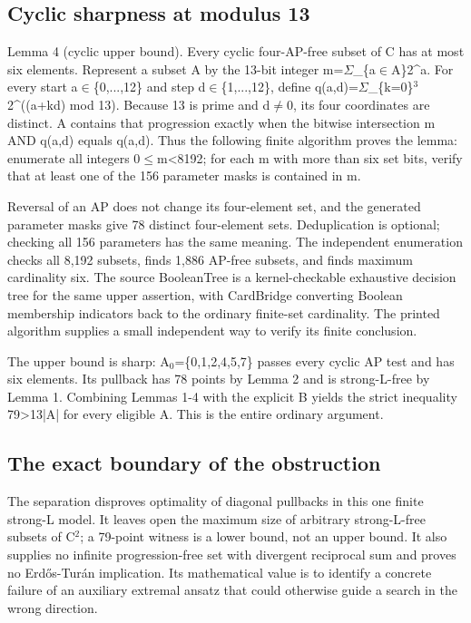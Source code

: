 \documentclass[11pt,a4paper]{article}
\begin{document}
\subsection{Cyclic sharpness at modulus 13}
Lemma 4 (cyclic upper bound). Every cyclic four-AP-free subset of C has at most six elements. Represent a subset A by the 13-bit integer m=\ensuremath{\Sigma}\_\{a\ensuremath{\in}A\}2\textasciicircum{}a. For every start a\ensuremath{\in}\{0,...,12\} and step d\ensuremath{\in}\{1,...,12\}, define q(a,d)=\ensuremath{\Sigma}\_\{k=0\}\ensuremath{^3}2\textasciicircum{}((a+kd) mod 13). Because 13 is prime and d\ensuremath{\neq}0, its four coordinates are distinct. A contains that progression exactly when the bitwise intersection m AND q(a,d) equals q(a,d). Thus the following finite algorithm proves the lemma: enumerate all integers 0\ensuremath{\leq}m<8192; for each m with more than six set bits, verify that at least one of the 156 parameter masks is contained in m.

Reversal of an AP does not change its four-element set, and the generated parameter masks give 78 distinct four-element sets. Deduplication is optional; checking all 156 parameters has the same meaning. The independent enumeration checks all 8,192 subsets, finds 1,886 AP-free subsets, and finds maximum cardinality six. The source BooleanTree is a kernel-checkable exhaustive decision tree for the same upper assertion, with CardBridge converting Boolean membership indicators back to the ordinary finite-set cardinality. The printed algorithm supplies a small independent way to verify its finite conclusion.

The upper bound is sharp: A\ensuremath{_0}=\{0,1,2,4,5,7\} passes every cyclic AP test and has six elements. Its pullback has 78 points by Lemma 2 and is strong-L-free by Lemma 1. Combining Lemmas 1-4 with the explicit B yields the strict inequality 79>13|A| for every eligible A. This is the entire ordinary argument.

\subsection{The exact boundary of the obstruction}
The separation disproves optimality of diagonal pullbacks in this one finite strong-L model. It leaves open the maximum size of arbitrary strong-L-free subsets of C\ensuremath{^2}; a 79-point witness is a lower bound, not an upper bound. It also supplies no infinite progression-free set with divergent reciprocal sum and proves no Erdős-Turán implication. Its mathematical value is to identify a concrete failure of an auxiliary extremal ansatz that could otherwise guide a search in the wrong direction.
\end{document}
